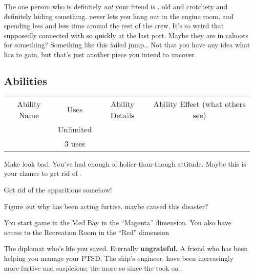 \documentclass[char]{TMFHope}
\begin{document}
The one person who is definitely \emph{not} your friend is \cEng{\full}. \cEng{\They} \cEng{\are} old and crotchety and definitely hiding something. \cEng{} never lets you hang out in the engine room, and \cEng{\they} \cEng{\are} spending less and less time around the rest of the crew. It's so weird that \cEng{\they} supposedly connected with \cBoy{} so quickly at the last port. Maybe they are in cahoots for something? Something like this failed jump\ldots{} Not that you have any idea what \cEng{} has to gain, but that's just another piece you intend to uncover.

\subsection{Abilities}
\begin{tabular}{ |c|c|c|c| } 
 \hline
 Ability Name & Uses & Ability Details & Ability Effect (what others see) \\ 
 \aThreat{\MyName} & Unlimited & \aThreat{\MYtext} & \aThreat{\MYeffect} \\ 
 \aFirstAid{\MyName} & 3 uses & \aFirstAid{\MYtext} & \aFirstAid{\MYeffect}\\ 
 \hline
\end{tabular}

\begin{itemz}[Goals]
	\item Make \cDip{} look bad. You've had enough of \cDip{\their} holier-than-though attitude. Maybe this is your chance to get rid of \cDip{\them}.
	\item Get rid of the apparitions somehow!
	\item Figure out why \cEng{} has been acting furtive. maybe \cEng{\they} caused this disaster?
\end{itemz}

\begin{itemz}[Notes]
	\item You start game in the Med Bay in the ``Magenta'' dimension. You also have access to the Recreation Room in the ``Red'' dimension
\end{itemz}

\begin{contacts}
	\contact{\cDip{}} The diplomat who's life you saved. Eternally \textbf{ungrateful.}
	\contact{\cNav{}} A friend who has been helping you manage your PTSD.
	\contact{\cEng{}} The ship's engineer. \cEng{\They} have been increasingly more furtive and suspicious; the more so since the \pNew{} took on \cBoy{}.
\end{contacts}
\end{document}
